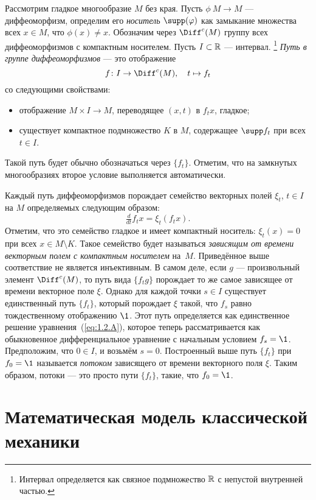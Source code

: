 Рассмотрим гладкое многообразие $M$ без края.
Пусть $\phi\: M \to M$ — диффеоморфизм, определим его \emph{носитель} \index[symb]{$\supp(\phi)$}$\supp(\phi)$ как замыкание множества всех $x \in M$, что $\phi(x) \ne x$.
Обозначим через $\Diff^c (M)$ группу всех диффеоморфизмов с компактным носителем.
Пусть $I \subset \mathbb{R}$ — интервал.%
\footnote{Интервал определяется как связное подмножество $\mathbb{R}$ с непустой внутренней частью.}
\emph{Путь в группе диффеоморфизмов} — это отображение 
\[f\: I \to \Diff^c (M),\quad t \mapsto f_t\]
со следующими свойствами:
\begin{itemize}
\item отображение $M \times I \to M$, переводящее $(x, t)$ в $f_t x$, гладкое;
\item существует компактное подмножество $K$ в $M$, содержащее $\supp f_t$ при всех $t \in I$.
\end{itemize}
Такой путь будет обычно обозначаться через $\{f_t\}$.
Отметим, что на замкнутых многообразиях второе условие выполняется автоматически.

Каждый путь диффеоморфизмов порождает семейство векторных полей $\xi_t$, $t \in I$ на $M$ определяемых следующим образом: 
\begin{equation}\tfrac{d}{dt} f_t x = \xi_t (f_t x).
\label{eq:1.2.A}
\end{equation}
Отметим, что это семейство гладкое и имеет компактный носитель: $\xi_t (x) = 0$ при всех $x \in M \setminus K$.
Такое семейство будет называться \textit{зависящим от времени векторным полем с компактным носителем} на~$M$.
Приведённое выше соответствие не является инъективным.
В самом деле, если $g$ — произвольный элемент $\Diff^c (M)$, то путь вида $\{f_t g\}$ порождает то же самое зависящее от времени векторное поле $\xi$.
Однако для каждой точки $s \in I$ существует единственный путь $\{f_t\}$, который 
порождает $\xi$ такой, что $f_s$ равно тождественному отображению $\1$.
Этот путь определяется как единственное решение уравнения~(\ref{eq:1.2.A}), которое теперь рассматривается как обыкновенное дифференциальное уравнение с начальным условием $f_s = \1$.
Предположим, что $0 \in I$, и возьмём $s = 0$.
Построенный выше путь $\{f_t\}$ при $f_0 = \1$ называется \emph{потоком} зависящего от времени векторного поля $\xi$.
Таким образом, потоки — это просто пути $\{f_t\}$, такие, что $f_0 = \1$.

\section[Классическая механика]{Математическая модель классической механики}

